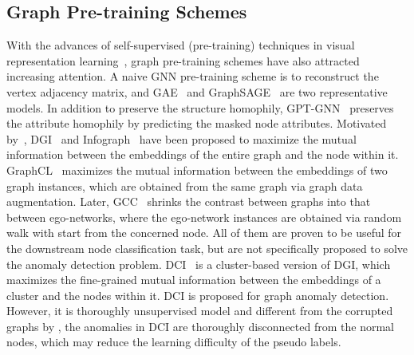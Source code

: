 \subsection{Graph Pre-training Schemes}
With the advances of self-supervised (pre-training) techniques in visual representation learning~\cite{chen2020simple,he2020momentum, chen2021exploring}, graph pre-training schemes have also attracted increasing attention. A naive GNN pre-training scheme is to reconstruct the vertex adjacency matrix, and GAE~\cite{kipf2016variational} and GraphSAGE~\cite{Graphsage} are two representative models. In addition to preserve the structure homophily, GPT-GNN~\cite{hu2020gpt} preserves the attribute homophily by predicting the masked node attributes. Motivated by~\cite{hjelm2018learning}, DGI~\cite{velickovic2019deep} and Infograph~\cite{Infograph} have been proposed to maximize the mutual information between the embeddings of the entire graph and the node within it. 
GraphCL~\cite{you2020graph} maximizes the mutual information between the embeddings of two graph instances, which are obtained from the same graph via graph data augmentation. Later, GCC~\cite{qiu2020gcc} shrinks the contrast between graphs into that between ego-networks, where the ego-network instances are obtained via random walk with start from the concerned node. All of them are proven to be useful for the downstream node classification task, but are not specifically proposed to solve the anomaly detection problem. DCI~\cite{wang2021decoupling} is a cluster-based version of DGI, 
which maximizes the fine-grained mutual information between the embeddings of a cluster and the nodes within it. DCI is proposed for graph anomaly detection. However, it is thoroughly unsupervised model and different from the corrupted graphs by \pmodel, the anomalies in DCI are thoroughly disconnected from the normal nodes, 
which may reduce the learning difficulty of the pseudo labels.

